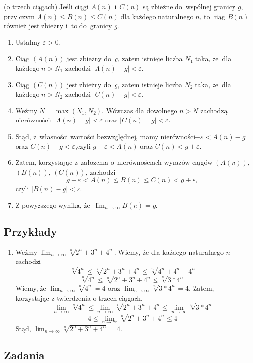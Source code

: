 \begin{tw}
    \label{bolwei}
		(o trzech ciągach)
    Jeśli ciągi $A(n)$ i~$C(n)$ są zbieżne do~wspólnej granicy $g$, przy czym $ A(n) \leqslant B(n) \leqslant C(n) $ dla każdego naturalnego $n$, to~ciąg $B(n)$ również jest zbieżny 
    i~to do~granicy $g$.
\end{tw}
\begin{dow}
    \begin{enumerate}
        \item Ustalmy $\varepsilon > 0$. 
        \item Ciąg $(A(n))$ jest zbieżny do~$g$, zatem istnieje liczba $N_1$ taka, że~dla każdego $n>N_1$ zachodzi $|A(n)-g| < \varepsilon$.
        \item Ciąg $(C(n))$ jest zbieżny do~$g$, zatem istnieje liczba $N_2$ taka, że~dla każdego $n>N_2$ zachodzi $|C(n)-g| < \varepsilon$.
        \item Weźmy $N = \max(N_1, N_2)$. Wówczas dla dowolnego $n>N$ zachodzą nierówności: $|A(n)-g| < \varepsilon$ oraz $|C(n)-g| <  \varepsilon$.~\cite{granice2}
        \item Stąd, z~własności wartości bezwzględnej, mamy nierówności\newline $-\varepsilon < A(n)-g$ oraz $C(n)-g < \varepsilon$,\newline czyli $g-\varepsilon < A(n)$ oraz $C(n) < g+\varepsilon$.
        \item Zatem, korzystając z~założenia o~nierównościach wyrazów ciągów $(A(n))$, $(B(n))$, $(C(n))$, zachodzi $$g-\varepsilon < A(n) \leqslant B(n) \leqslant C(n) < g+\varepsilon,$$ 
        czyli $|B(n) - g| < \varepsilon$.
        \item Z powyższego wynika, że~$\lim_{n \to \infty} B(n) = g$.~\cite{granice2}
    \end{enumerate}
\end{dow}

\newpage
\subsection{Przykłady}

\begin{enumerate}
    \item Weźmy $\lim_{n \to \infty} \sqrt[n]{2^n + 3^n + 4^n}$. Wiemy, że dla każdego naturalnego $n$ zachodzi 
    $$ \sqrt[n]{4^n} \leqslant \sqrt[n]{2^n + 3^n + 4^n} \leqslant \sqrt[n]{4^n + 4^n + 4^n} $$
    $$ \sqrt[n]{4^n} \leqslant \sqrt[n]{2^n + 3^n + 4^n} \leqslant \sqrt[n]{3 * 4^n} $$
    Wiemy, że $\lim_{n \to \infty} \sqrt[n]{4^n} = 4$ oraz $\lim_{n \to \infty} \sqrt[n]{3*4^n} = 4$. 
    Zatem, korzystając z twierdzenia o trzech ciągach,
    $$ \lim_{n \to \infty} \sqrt[n]{4^n} \leqslant \lim_{n \to \infty} \sqrt[n]{2^n + 3^n + 4^n} \leqslant \lim_{n \to \infty} \sqrt[n]{3 * 4^n} $$
    $$ 4 \leqslant \lim_{n \to \infty} \sqrt[n]{2^n + 3^n + 4^n} \leqslant 4 $$
    Stąd, $\lim_{n \to \infty} \sqrt[n]{2^n + 3^n + 4^n} = 4$.
\end{enumerate}

\newpage
\subsection{Zadania}